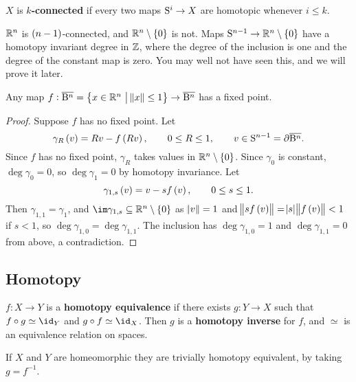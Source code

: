 \begin{definition*}
$ X $ is \textbf{$ k $-connected} if every two maps $ \S^i \to X $ are homotopic whenever $ i \le k $.
\end{definition*}

\begin{example*}
$ \RR^n $ is $ \br{n - 1} $-connected, and $ \RR^n \setminus \cbr{0} $ is not. Maps $ \S^{n - 1} \to \RR^n \setminus \cbr{0} $ have a homotopy invariant degree in $ \ZZ $, where the degree of the inclusion is one and the degree of the constant map is zero. You may well not have seen this, and we will prove it later.
\end{example*}

\pagebreak

\begin{corollary}
Any map $ f : \overline{\B^n} = \cbr{x \in \RR^n \st \norm{x} \le 1} \to \overline{\B^n} $ has a fixed point.
\end{corollary}

\begin{proof}
Suppose $ f $ has no fixed point. Let
$$ \gamma_R\br{v} = Rv - f\br{Rv}, \qquad 0 \le R \le 1, \qquad v \in \S^{n - 1} = \da\overline{\B^n}. $$
Since $ f $ has no fixed point, $ \gamma_R $ takes values in $ \RR^n \setminus \cbr{0} $. Since $ \gamma_0 $ is constant, $ \deg \gamma_0 = 0 $, so $ \deg \gamma_1 = 0 $ by homotopy invariance. Let
$$ \gamma_{1, s}\br{v} = v - sf\br{v}, \qquad 0 \le s \le 1. $$
Then $ \gamma_{1, 1} = \gamma_1 $, and $ \im \gamma_{1, s} \subseteq \RR^n \setminus \cbr{0} $ as $ \norm{v} = 1 $ and $ \norm{sf\br{v}} = \abs{s}\norm{f\br{v}} < 1 $ if $ s < 1 $, so $ \deg \gamma_{1, 0} = \deg \gamma_{1, 1} $. The inclusion has $ \deg \gamma_{1, 0} = 1 $ and $ \deg \gamma_{1, 1} = 0 $ from above, a contradiction.
\end{proof}

\subsection{Homotopy}

\begin{definition*}
$ f : X \to Y $ is a \textbf{homotopy equivalence} if there exists $ g : Y \to X $ such that $ f \circ g \simeq \id_Y $ and $ g \circ f \simeq \id_X $. Then $ g $ is a \textbf{homotopy inverse} for $ f $, and $ \simeq $ is an equivalence relation on spaces.
\end{definition*}

\begin{example*}
If $ X $ and $ Y $ are homeomorphic they are trivially homotopy equivalent, by taking $ g = f^{-1} $.
\end{example*}

